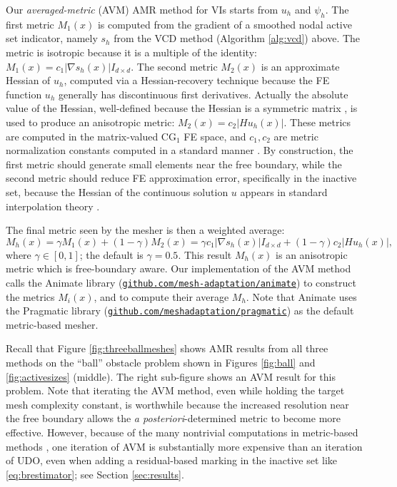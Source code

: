 \documentclass[]{interact}
\theoremstyle{plain}%
\theoremstyle{definition}
\theoremstyle{remark}
\newcommand{\grad}{\nabla}
\newcommand{\CG}{\text{CG}}
\begin{document}
Our \emph{averaged-metric} (AVM) AMR method for VIs starts from $u_h$ and $\psi_h$.  The first metric $M_1(x)$ is computed from the gradient of a smoothed nodal active set indicator, namely $s_h$ from the VCD method (Algorithm \ref{alg:vcd}) above.  The metric is isotropic because it is a multiple of the identity: $M_1(x) = c_1 |\grad s_h(x)| I_{d\times d}$.  The second metric $M_2(x)$ is an approximate Hessian of $u_h$, computed via a Hessian-recovery technique \cite{Alauzet2010} because the FE function $u_h$ generally has discontinuous first derivatives.  Actually the absolute value of the Hessian, well-defined because the Hessian is a symmetric matrix \cite{Wallworketal2020}, is used to produce an anisotropic metric: $M_2(x) = c_2 |H u_h(x)|$.  These metrics are computed in the matrix-valued $\CG_1$ FE space, and $c_1,c_2$ are metric normalization constants computed in a standard manner \cite{Wallworketal2020}.  By construction, the first metric should generate small elements near the free boundary, while the second metric should reduce FE approximation error, specifically in the inactive set, because the Hessian of the continuous solution $u$ appears in standard interpolation theory \cite{Wallworketal2020}.

The final metric seen by the mesher is then a weighted average:
\begin{equation} \label{eq:avm}
M_h(x) = \gamma M_1(x) + (1-\gamma) M_2(x) = \gamma c_1 |\grad s_h(x)| I_{d\times d} + (1-\gamma) c_2 |H u_h(x)|,
\end{equation}
where $\gamma \in [0,1]$; the default is $\gamma=0.5$.  This result $M_h(x)$ is an anisotropic metric which is free-boundary aware.  Our implementation of the AVM method calls the Animate library (\href{https://github.com/mesh-adaptation/animate}{{\small \texttt{github.com/mesh-adaptation/animate}}}) to construct the metrics $M_i(x)$, and to compute their average $M_h$.  Note that Animate uses the Pragmatic library (\href{https://github.com/meshadaptation/pragmatic}{{\small \texttt{github.com/meshadaptation/pragmatic}}}) as the default metric-based mesher.

Recall that Figure \ref{fig:threeballmeshes} shows AMR results from all three methods on the ``ball'' obstacle problem shown in Figures \ref{fig:ball} and \ref{fig:activesizes} (middle).  The right sub-figure shows an AVM result for this problem.  Note that iterating the AVM method, even while holding the target mesh complexity constant, is worthwhile because the increased resolution near the free boundary allows the \emph{a posteriori}-determined metric to become more effective.  However, because of the many nontrivial computations in metric-based methods \cite{Alauzet2010,Wallworketal2020}, one iteration of AVM is substantially more expensive than an iteration of UDO, even when adding a residual-based marking in the inactive set like \eqref{eq:brestimator}; see Section \ref{sec:results}.
\end{document}
